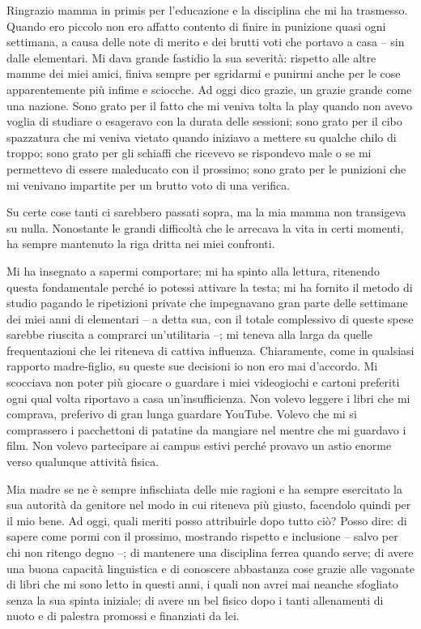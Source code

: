 Ringrazio mamma in primis per l'educazione e la disciplina che mi ha
trasmesso. Quando ero piccolo non ero affatto contento di finire in
punizione quasi ogni settimana, a causa delle note di merito e dei
brutti voti che portavo a casa -- sin dalle elementari. Mi dava grande
fastidio la sua severità: rispetto alle altre mamme dei miei amici,
finiva sempre per sgridarmi e punirmi anche per le cose apparentemente
più infime e sciocche. Ad oggi dico grazie, un grazie grande come una
nazione. Sono grato per il fatto che mi veniva tolta la play quando non
avevo voglia di studiare o esageravo con la durata delle sessioni; sono
grato per il cibo spazzatura che mi veniva vietato quando iniziavo a
mettere su qualche chilo di troppo; sono grato per gli schiaffi che
ricevevo se rispondevo male o se mi permettevo di essere maleducato con
il prossimo; sono grato per le punizioni che mi venivano impartite per 
un brutto voto di una verifica.

Su certe cose tanti ci sarebbero passati sopra, ma la mia mamma non
transigeva su nulla. Nonostante le grandi difficoltà che le arrecava la
vita in certi momenti, ha sempre mantenuto la riga dritta nei miei
confronti.

Mi ha insegnato a sapermi comportare; mi ha spinto alla lettura,
ritenendo questa fondamentale perché io potessi attivare la testa; mi
ha fornito il metodo di studio pagando le ripetizioni private che
impegnavano gran parte delle settimane dei miei anni di elementari -- a
detta sua, con il totale complessivo di queste spese sarebbe riuscita a
comprarci un'utilitaria --; mi teneva alla larga da quelle
frequentazioni che lei riteneva di cattiva influenza. Chiaramente, come
in qualsiasi rapporto madre-figlio, su queste sue decisioni io non ero
mai d'accordo. Mi scocciava non poter più giocare o guardare i miei
videogiochi e cartoni preferiti ogni qual volta riportavo a casa
un'insufficienza. Non volevo leggere i libri che mi comprava, preferivo
di gran lunga guardare YouTube. Volevo che mi si comprassero i
pacchettoni di patatine da mangiare nel mentre che mi guardavo i film.
Non volevo partecipare ai campus estivi perché provavo un astio enorme
verso qualunque attività fisica.

Mia madre se ne è sempre infischiata delle mie ragioni e ha sempre
esercitato la sua autorità da genitore nel modo in cui riteneva più
giusto, facendolo quindi per il mio bene. Ad oggi, quali meriti posso
attribuirle dopo tutto ciò? Posso dire: di sapere come pormi con il
prossimo, mostrando rispetto e inclusione -- salvo per chi non ritengo
degno --; di mantenere una disciplina ferrea quando serve; di avere
una buona capacità linguistica e di conoscere abbastanza cose grazie
alle vagonate di libri che mi sono letto in questi anni, i quali non
avrei mai neanche sfogliato senza la sua spinta iniziale; di avere un
bel fisico dopo i tanti allenamenti di nuoto e di palestra promossi e
finanziati da lei. 

